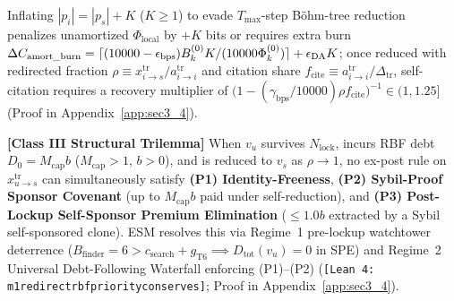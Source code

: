 \documentclass[runningheads,a4paper]{llncs}
\renewcommand{\_}{\textunderscore\allowbreak}
\newcommand{\leanref}[1]{{\footnotesize\texttt{[Lean 4: #1]}}}
\begin{document}
\begin{proposition}
\label{prop:obfuscation_duality}
Inflating $|p_i| = |p_s| + K$ ($K \ge 1$) to evade $T_{\max}$-step B\"ohm-tree reduction penalizes unamortized $\Phi_{\text{local}}$ by $+K$ bits or requires extra burn $\Delta C_{\text{amort\_burn}} = \lceil (10000 - \epsilon_{\text{bps}}) B_k^{(0)} K / (10000 \Phi_k^{(0)}) \rceil + \epsilon_{\text{DA}} K$; once reduced with redirected fraction $\rho \equiv x_{i \to s}^{\text{tr}} / a_{i \to i}^{\text{tr}}$ and citation share $f_{\text{cite}} \equiv a_{i \to i}^{\text{tr}} / \Delta_{\text{tr}}$, self-citation requires a recovery multiplier of $\big(1 - (\gamma_{\text{bps}}/10000)\rho f_{\text{cite}}\big)^{-1} \in (1,\allowbreak 1.25]$ (Proof in Appendix~\ref{app:sec3_4}).
\end{proposition}

\begin{proposition}
\label{prop:trilemma}
\textbf{[Class III Structural Trilemma]} When $v_u$ survives $N_{\text{lock}}$, incurs RBF debt $D_0 = M_{\text{cap}} b$ ($M_{\text{cap}} > 1$, $b > 0$), and is reduced to $v_s$ as $\rho \to 1$, no ex-post rule on $x_{u \to s}^{\text{tr}}$ can simultaneously satisfy \textbf{(P1) Identity-Freeness}, \textbf{(P2) Sybil-Proof Sponsor Covenant} (up to $M_{\text{cap}} b$ paid under self-reduction), and \textbf{(P3) Post-Lockup Self-Sponsor Premium Elimination} ($\le 1.0b$ extracted by a Sybil self-sponsored clone). ESM resolves this via Regime~1 pre-lockup watchtower deterrence ($B_{\text{finder}} = 6 > c_{\text{search}} + g_{\text{T6}} \implies D_{\text{tot}}(v_u) = 0$ in SPE) and Regime~2 Universal Debt-Following Waterfall enforcing (P1)--(P2) (\leanref{m1\_redirect\_rbf\_priority\_conserves}; Proof in Appendix~\ref{app:sec3_4}).
\end{proposition}
\end{document}
